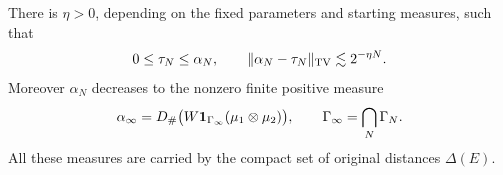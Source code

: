 \begin{lemma}\label{asm:retained-measures}
There is $\eta>0$, depending on the fixed parameters and starting
measures, such that
\begin{equation}
 \label{asm:tv-approximation}
 0\le\tau_N\le\alpha_N,\qquad
 \|\alpha_N-\tau_N\|_{\mathrm{TV}}\lesssim2^{-\eta N}.
\end{equation}
Moreover $\alpha_N$ decreases to the nonzero finite positive measure
\begin{equation}
 \label{asm:limit-measure}
 \alpha_\infty=D_\#\bigl(W\mathbf 1_{\Gamma_\infty}
                               (\mu_1\otimes\mu_2)\bigr),\qquad
 \Gamma_\infty=\bigcap_N\Gamma_N.
\end{equation}
All these measures are carried by the compact set of original distances
$\Delta(E)$.
\end{lemma}

